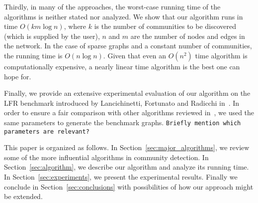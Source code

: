 Thirdly, in many of the approaches, the worst-case running time of the algorithms 
is neither stated nor analyzed. We show that our algorithm runs in time $O(k m \log n)$, 
where $k$ is the number of communities to be discovered (which is supplied by the user), 
$n$ and $m$ are the number of nodes and edges in the network. In the case of sparse graphs 
and a constant number of communities, the running time is $O(n \log n)$. Given that even 
an $O(n^2)$ time algorithm is computationally expensive, a nearly linear time algorithm 
is the best one can hope for.

Finally, we provide an extensive experimental evaluation of our algorithm on the LFR benchmark
introduced by Lancichinetti, Fortunato and Radicchi in~\cite{LFR08, LF09}. In order to ensure 
a fair comparison with other algorithms reviewed in~\cite{LF09}, we used the same parameters 
to generate the benchmark graphs. \texttt{Briefly mention which parameters are relevant?}


This paper is organized as follows. In Section~\ref{sec:major_algorithms}, we review some 
of the more influential algorithms in community detection. In Section~\ref{sec:algorithm}, we 
describe our algorithm and analyze its running time. In Section~\ref{sec:experiments}, we present 
the experimental results. Finally we conclude in Section~\ref{sec:conclusions} with possibilities
of how our approach might be extended. 



